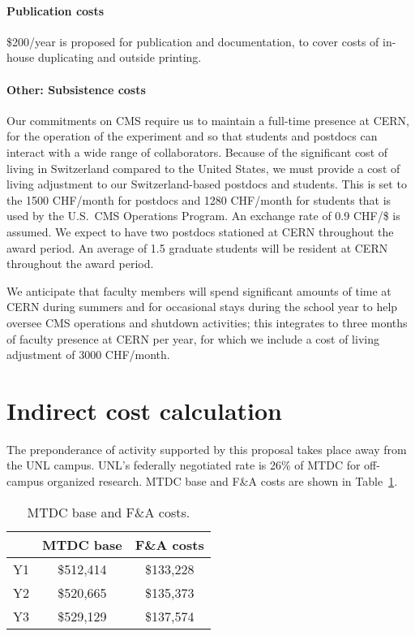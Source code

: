 \documentclass[11pt]{article}
\begin{document}
\paragraph{Publication costs} \$200/year is proposed for publication and
documentation, to cover costs of in-house duplicating and outside printing.

\paragraph{Other: Subsistence costs} Our commitments on CMS require us to
maintain a full-time presence at CERN, for the operation of the experiment
and so that students and postdocs can interact with a wide range of
collaborators.  Because of the significant cost of living in Switzerland
compared to the United States, we must provide a cost of living adjustment
to our Switzerland-based postdocs and students.  This is set to the 1500
CHF/month for postdocs and 1280 CHF/month for students that is used by the
U.S.~CMS Operations Program.  An exchange rate of 0.9 CHF/\$ is assumed.
We expect to have two postdocs stationed at CERN throughout the award
period.  An average of 1.5 graduate students will be resident at CERN
throughout the award period.

We anticipate that faculty members will spend significant amounts of time
at CERN during summers and for occasional stays during the school year to
help oversee CMS operations and shutdown activities; this integrates to three
months of faculty presence at CERN per year, for which we include a cost of
living adjustment of 3000 CHF/month.

\section{Indirect cost calculation} The preponderance of activity supported
by this proposal takes place away from the UNL campus. UNL's federally
negotiated rate is 26\% of MTDC for off-campus organized research.  MTDC base and F\&A costs are shown in Table~\ref{tab:MTDC}.

\begin{table}[h]
\centering
\begin{tabular}{ccc}\hline
 & MTDC base  & F\&A costs \\\hline
Y1 & \$512,414 & \$133,228 \\ 
Y2 & \$520,665 & \$135,373 \\ 
Y3 & \$529,129 & \$137,574 \\ \hline
\end{tabular}
\caption{MTDC base and F\&A costs.} 
\label{tab:MTDC}
\end{table}
\end{document}
